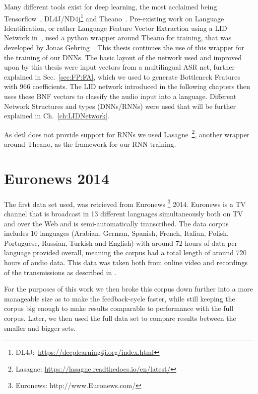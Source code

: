 Many different tools exist for deep learning, the most acclaimed being Tensorflow~\cite{DBLP:journals/corr/AbadiABBCCCDDDG16}, DL4J/ND4j\footnote{DL4J:~\url{https://deeplearning4j.org/index.html}} and Theano~\cite{bergstra2011theano}. Pre-existing work on Language Identification, or rather Language Feature Vector Extraction using a LID Network in~\cite{Mueller2016b}, used a python wrapper around Theano for training, that was developed by Jonas Gehring~\cite{gehringMA}. This thesis continues the use of this wrapper for the training of our DNNs. The basic layout of the network used and improved upon by this thesis were input vectors from a multilingual ASR net, further explained in Sec.~\ref{sec:FP:FA}, which we used to generate Bottleneck Features with 966 coefficients. The LID network introduced in the following chapters then uses these BNF vectors to classify the audio input into a language. Different Network Structures and types (DNNs/RNNs) were used that will be further explained in Ch.~\ref{ch:LIDNetwork}. 

As detl does not provide support for RNNs we used Lasagne~\footnote{Lasagne: \url{https://lasagne.readthedocs.io/en/latest/}}, another wrapper around Theano, as the framework for our RNN training.

\section{Euronews 2014}
\label{sec:LITasks:Euronews}


The first data set used, was retrieved from Euronews \footnote{Euronews: http://www.Euronews.com/} 2014. Euronews is a TV channel that is broadcast in 13 different languages simultaneously both on TV and over the Web and is semi-automatically transcribed. The data corpus includes 10 languages (Arabian, German, Spanish, French, Italian, Polish, Portuguese, Russian, Turkish and English) with around 72 hours of data per language provided overall, meaning the corpus had a total length of around 720 hours of audio data. This data was taken both from online video and recordings of the transmissions as described in \cite{gretter2014Euronews}.

For the purposes of this work we then broke this corpus down further into a more manageable size as to make the feedback-cycle faster, while still keeping the corpus big enough to make results comparable to performance with the full corpus. Later, we then used the full data set to compare results between the smaller and bigger sets.

